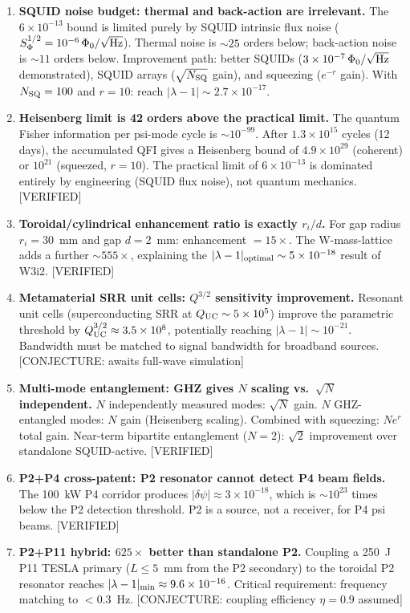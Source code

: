\documentclass[11pt,twocolumn]{article}
\newcommand{\dpsi}{\delta\psi}
\newcommand{\lam}{\lambda}
\newcommand{\ee}[1]{\times 10^{#1}}
\theoremstyle{definition}
\theoremstyle{remark}
\begin{document}
\begin{enumerate}

\item \textbf{SQUID noise budget: thermal and back-action are irrelevant.}
The $6\ee{-13}$ bound is limited purely by SQUID intrinsic flux noise
($S_\Phi^{1/2} = 10^{-6}\,\Phi_0/\sqrt{\rm Hz}$).  Thermal noise is
$\sim 25$ orders below; back-action noise is $\sim 11$ orders below.
Improvement path: better SQUIDs ($3\ee{-7}\,\Phi_0/\sqrt{\rm Hz}$ demonstrated),
SQUID arrays ($\sqrt{N_{\rm SQ}}$ gain), and squeezing ($e^{-r}$ gain).
With $N_{\rm SQ} = 100$ and $r = 10$: reach $|\lam-1| \sim 2.7\ee{-17}$.

\item \textbf{Heisenberg limit is 42 orders above the practical limit.}
The quantum Fisher information per psi-mode cycle is $\sim 10^{-99}$.
After $1.3\ee{15}$ cycles (12 days), the accumulated QFI gives a
Heisenberg bound of $4.9\ee{29}$ (coherent) or $10^{21}$ (squeezed, $r=10$).
The practical limit of $6\ee{-13}$ is dominated entirely by engineering
(SQUID flux noise), not quantum mechanics. [VERIFIED]

\item \textbf{Toroidal/cylindrical enhancement ratio is exactly $r_i/d$.}
For gap radius $r_i = 30$~mm and gap $d = 2$~mm: enhancement $= 15\times$.
The W-mass-lattice adds a further $\sim 555\times$, explaining the
$|\lam-1|_{\rm optimal} \sim 5\ee{-18}$ result of W3i2. [VERIFIED]

\item \textbf{Metamaterial SRR unit cells: $Q^{3/2}$ sensitivity improvement.}
Resonant unit cells (superconducting SRR at $Q_{\rm UC} \sim 5\ee{5}$) improve
the parametric threshold by $Q_{\rm UC}^{3/2} \approx 3.5\ee{8}$, potentially
reaching $|\lam-1| \sim 10^{-21}$.  Bandwidth must be matched to signal
bandwidth for broadband sources. [CONJECTURE: awaits full-wave simulation]

\item \textbf{Multi-mode entanglement: GHZ gives $N$ scaling vs.\ $\sqrt{N}$ independent.}
$N$ independently measured modes: $\sqrt{N}$ gain.
$N$ GHZ-entangled modes: $N$ gain (Heisenberg scaling).
Combined with squeezing: $N e^r$ total gain.
Near-term bipartite entanglement ($N = 2$): $\sqrt{2}$ improvement
over standalone SQUID-active. [VERIFIED]

\item \textbf{P2+P4 cross-patent: P2 resonator cannot detect P4 beam fields.}
The 100~kW P4 corridor produces $|\dpsi| \approx 3\ee{-18}$, which is
$\sim 10^{23}$ times below the P2 detection threshold.  P2 is a source,
not a receiver, for P4 psi beams. [VERIFIED]

\item \textbf{P2+P11 hybrid: $625\times$ better than standalone P2.}
Coupling a 250~J P11 TESLA primary ($L \leq 5$~mm from the P2 secondary)
to the toroidal P2 resonator reaches $|\lam-1|_{\rm min} \approx 9.6\ee{-16}$.
Critical requirement: frequency matching to $< 0.3$~Hz. [CONJECTURE:
coupling efficiency $\eta = 0.9$ assumed]

\end{enumerate}
\end{document}
